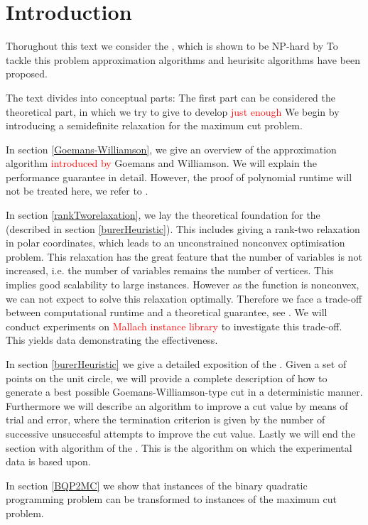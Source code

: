 \documentclass[12pt,a4paper]{article}
\theoremstyle{mythm}
\begin{document}
\section{ Introduction  } 
Thorughout this text we consider the \mcp, which is shown to be NP-hard by \cite{Garey1974}
To tackle this problem approximation algorithms and heurisitc algorithms have been proposed.

The text divides into conceptual parts: The first part can be considered the theoretical part, in which we try to give to develop \textcolor{red}{just enough }
We begin by introducing a semidefinite relaxation for the maximum cut problem.

In section \ref{Goemans-Williamson}, we give an overview of the approximation algorithm \textcolor{red}{introduced by} Goemans and Williamson. We will explain the performance
guarantee in detail. However, the proof of polynomial runtime will not be treated here, we refer to \cite{Korte2018}.

In section \ref{rankTworelaxation}, we lay the theoretical foundation for the \BH (described in section \ref{burerHeuristic}).
This includes giving a rank-two relaxation in polar coordinates, which leads to an unconstrained nonconvex optimisation problem. This relaxation has the great feature that the
number of variables is not increased, i.e. the number of variables remains the number of vertices.
This implies good scalability to large instances.
However as the function is nonconvex, we can not expect to solve this relaxation optimally.
Therefore we face a trade-off between computational runtime and a theoretical guarantee, see \cite[p. 506]{Burer2002}.
We will conduct experiments on \textcolor{red}{Mallach instance library} to investigate this trade-off. This yields data demonstrating the effectiveness.

In section \ref{burerHeuristic} we give a detailed exposition of the \BH.
Given a set of points on the unit circle, we will provide a complete description of how to generate a best possible Goemans-Williamson-type cut in a deterministic manner. 
Furthermore we will describe an algorithm to improve a cut value by means of trial and error, where the termination criterion is given by the number of successive unsuccesful
attempts to improve the cut value.
Lastly we will end the section with algorithm of the \BH.
This is the algorithm on which the experimental data is based upon.

In section \ref{BQP2MC} we show that instances of the binary quadratic programming problem can be transformed to instances of the maximum cut problem.
\end{document}

